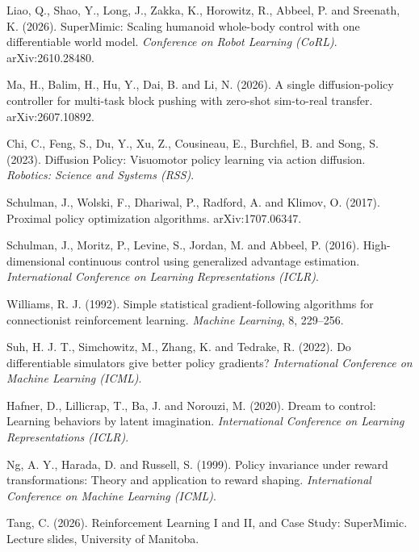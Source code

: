 \documentclass[11pt,a4paper]{article}
\begin{document}
\begin{enumerate}[label={[\arabic*]},leftmargin=1.8em,itemsep=7pt]
\item\label{ref:supermimic}
Liao, Q., Shao, Y., Long, J., Zakka, K., Horowitz, R., Abbeel, P. and Sreenath, K. (2026).
SuperMimic: Scaling humanoid whole-body control with one differentiable world model.
\emph{Conference on Robot Learning (CoRL)}. arXiv:2610.28480.

\item\label{ref:esm}
Ma, H., Balim, H., Hu, Y., Dai, B. and Li, N. (2026).
A single diffusion-policy controller for multi-task block pushing with zero-shot sim-to-real transfer.
arXiv:2607.10892.

\item\label{ref:diffpolicy}
Chi, C., Feng, S., Du, Y., Xu, Z., Cousineau, E., Burchfiel, B. and Song, S. (2023).
Diffusion Policy: Visuomotor policy learning via action diffusion.
\emph{Robotics: Science and Systems (RSS)}.

\item\label{ref:ppo}
Schulman, J., Wolski, F., Dhariwal, P., Radford, A. and Klimov, O. (2017).
Proximal policy optimization algorithms. arXiv:1707.06347.

\item\label{ref:gae}
Schulman, J., Moritz, P., Levine, S., Jordan, M. and Abbeel, P. (2016).
High-dimensional continuous control using generalized advantage estimation.
\emph{International Conference on Learning Representations (ICLR)}.

\item\label{ref:reinforce}
Williams, R. J. (1992).
Simple statistical gradient-following algorithms for connectionist reinforcement learning.
\emph{Machine Learning}, 8, 229--256.

\item\label{ref:suh}
Suh, H. J. T., Simchowitz, M., Zhang, K. and Tedrake, R. (2022).
Do differentiable simulators give better policy gradients?
\emph{International Conference on Machine Learning (ICML)}.

\item\label{ref:dreamer}
Hafner, D., Lillicrap, T., Ba, J. and Norouzi, M. (2020).
Dream to control: Learning behaviors by latent imagination.
\emph{International Conference on Learning Representations (ICLR)}.

\item\label{ref:shaping}
Ng, A. Y., Harada, D. and Russell, S. (1999).
Policy invariance under reward transformations: Theory and application to reward shaping.
\emph{International Conference on Machine Learning (ICML)}.

\item\label{ref:lectures}
Tang, C. (2026). Reinforcement Learning I and II, and Case Study: SuperMimic.
Lecture slides, University of Manitoba.
\end{enumerate}
\end{document}
